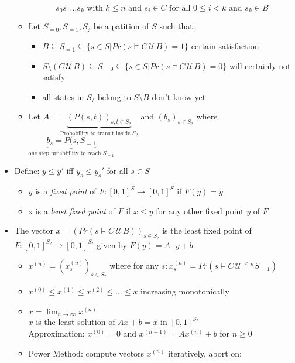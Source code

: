 \documentclass[a4paper, 10pt]{article}
\newcommand{\until}{\,\mathcal{U}\,}
\newcommand{\underbraceset}[2]{\underset{#1}{\underbrace{#2}}}
\begin{document}
\begin{mdframed}
\begin{itemize}
\begin{itemize}
        \[
        s_0s_1\dots s_k \text{ with } k\leq n \text{ and } s_i\in C \text{ for all } 0\leq i<k \text{ and } s_k\in B
        \]
        \item Let $S_{=0},S_{=1}, S_?$ be a patition of $S$ such that:
        \begin{itemize}
            \item $B\subseteq S_{=1}\subseteq \{s\in S|Pr(s\models C\until B)=1\}$ {\tiny certain satisfaction}
            \item $S\setminus (C\until B)\subseteq S_{=0} \subseteq \{s\in S|Pr(s\models C\until B)=0\}$ {\tiny will certainly not satisfy}
            \item all states in $S_?$ belong to $S\setminus B$ {\tiny don't know yet}
        \end{itemize}
        \item Let $A=\underbraceset{\text{Probability to transit inside } S_?}{(P(s,t))_{s,t\in S_?}}$ and $(b_s)_{s\in S_?}$ where $\underbraceset{\text{one step proabbility to reach } S_{=1}}{b_s=P(s,S_{=1}}$
    \end{itemize}
    \item Define: $y\leq y'$ iff $y_s\leq y_s'$ for all $s\in S$
    \begin{itemize}
        \item $y$ is a \emph{fixed point} of $F:[0,1]^S\to[0,1]^S$ if $F(y)=y$
        \item x is a \emph{least fixed point} of $F$ if $x\leq y$ for any other fixed point $y$ of $F$
    \end{itemize}
    \item The vector $x=\left(Pr(s\models C\until B)\right)_{s\in S_?}$ is the least fixed point of $F:[0,1]^{S_?}\to [0,1]^{S_?}$ given by $F(y)=A\cdot y+b$
    \begin{itemize}
        \item $x^{(n)}=\left( x_s^{(n)} \right)_{s\in S_?}$ where for any $s: x_s^{(n)}=Pr\left(s\models C\until^{\leq n}S_{=1}\right)$
        \item $x^{(0)}\leq x^{(1)}\leq x^{(2)}\leq\dots\leq x$ {\tiny increasing monotonically}
        \item $\displaystyle x=\lim_{n\to\infty} x^{(n)}$
        \\ \follows $x$ is the least solution of $Ax+b=x$ in $[0,1]^{S_?}$
        \\ \follows Approximation: $x^{(0)}=0$ and $x^{(n+1)}=Ax^{(n)}+b$ for $n\geq0$
        \item Power Method: compute vectors $x^{(n)}$ iteratively, abort on:

\end{itemize}
\end{itemize}
\end{mdframed}
\end{document}
